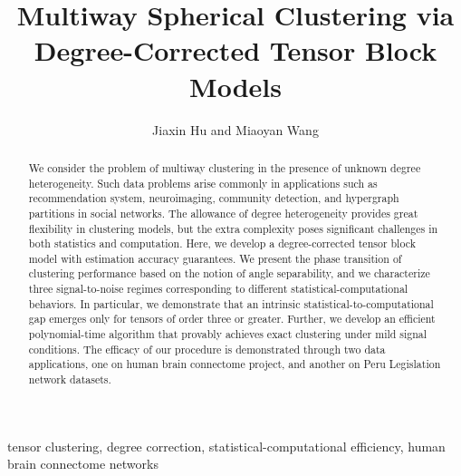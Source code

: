 \documentclass[lettersize,onecolumn,journal]{IEEEtran}
\theoremstyle{definition}
\theoremstyle{definition}
\begin{document}
\title{Multiway Spherical Clustering via \\ Degree-Corrected Tensor Block Models}

\author{ Jiaxin Hu and Miaoyan Wang
}



\maketitle

\begin{abstract}
We consider the problem of multiway clustering in the presence of unknown degree heterogeneity. Such data problems arise commonly in applications such as recommendation system, neuroimaging, community detection, and hypergraph partitions in social networks. The allowance of degree heterogeneity provides great flexibility in clustering models, but the extra complexity poses significant challenges in both statistics and computation. Here, we develop a degree-corrected tensor block model with estimation accuracy guarantees. We present the phase transition of clustering performance based on the notion of angle separability, and we characterize three signal-to-noise regimes corresponding to different statistical-computational behaviors. In particular, we demonstrate that an intrinsic statistical-to-computational gap emerges only for tensors of order three or greater. Further, we develop an efficient polynomial-time algorithm that provably achieves exact clustering under mild signal conditions. The efficacy of our procedure is demonstrated through two data applications, one on human brain connectome project, and another on Peru Legislation network datasets. 
\end{abstract}

\begin{IEEEkeywords}
tensor clustering, degree correction, statistical-computational efficiency, human brain connectome networks
\end{IEEEkeywords}
\end{document}
